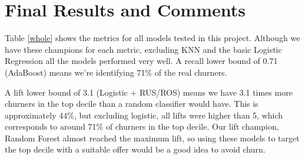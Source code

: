 \documentclass[12pt,letterpaper]{article}
\begin{document}
\section{Final Results and Comments}
Table \ref{whole} shows the metrics for all models tested in this project. 
Although we have these champions for each metric, excluding KNN and the basic Logistic Regression all the models performed very well. A recall lower bound of 0.71 (AdaBoost) means we're identifying 71\% of the real churners. 

A lift lower bound of 3.1 (Logistic + RUS/ROS) means we have 3.1 times more churners in the top decile than a random classifier would have. This is approximately 44\%, but excluding logistic, all lifts were higher than 5, which corresponds to around 71\% of churners in the top decile. Our lift champion, Random Forest almost reached the maximum lift, so using these models to target the top decile with a suitable offer would be a good idea to avoid churn.
\end{document}
